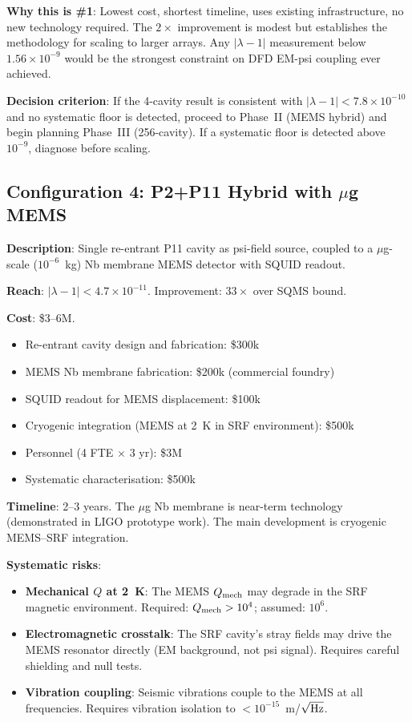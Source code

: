 \documentclass[11pt]{article}
\theoremstyle{definition}
\theoremstyle{remark}
\newcommand{\ee}[1]{\times 10^{#1}}
\newcommand{\lamdiff}{|\lambda-1|}
\begin{document}
\begin{tcolorbox}[colback=green!5!white, colframe=green!50!black,
  title=\textbf{RECOMMENDED FIRST EXPERIMENT}]
\textbf{Why this is \#1}: Lowest cost, shortest timeline, uses existing
infrastructure, no new technology required. The $2\times$ improvement is
modest but establishes the methodology for scaling to larger arrays.
Any $\lamdiff$ measurement below $1.56\ee{-9}$ would be the strongest
constraint on DFD EM-psi coupling ever achieved.

\textbf{Decision criterion}: If the 4-cavity result is consistent with
$\lamdiff < 7.8\ee{-10}$ and no systematic floor is detected, proceed
to Phase~II (MEMS hybrid) and begin planning Phase~III (256-cavity).
If a systematic floor is detected above $10^{-9}$, diagnose before scaling.
\end{tcolorbox}

\subsection{Configuration 4: P2+P11 Hybrid with $\mu$g MEMS}

\textbf{Description}: Single re-entrant P11 cavity as psi-field source,
coupled to a $\mu$g-scale ($10^{-6}$~kg) Nb membrane MEMS detector with
SQUID readout.

\textbf{Reach}: $\lamdiff < 4.7\ee{-11}$. Improvement: $33\times$ over
SQMS bound.

\textbf{Cost}: \$3--6M.
\begin{itemize}[nosep]
\item Re-entrant cavity design and fabrication: \$300k
\item MEMS Nb membrane fabrication: \$200k (commercial foundry)
\item SQUID readout for MEMS displacement: \$100k
\item Cryogenic integration (MEMS at 2~K in SRF environment): \$500k
\item Personnel (4 FTE $\times$ 3 yr): \$3M
\item Systematic characterisation: \$500k
\end{itemize}

\textbf{Timeline}: 2--3 years. The $\mu$g Nb membrane is near-term
technology (demonstrated in LIGO prototype work). The main development
is cryogenic MEMS--SRF integration.

\textbf{Systematic risks}:
\begin{itemize}[nosep]
\item \textbf{Mechanical $Q$ at 2~K}: The MEMS $Q_{\rm mech}$ may degrade
  in the SRF magnetic environment. Required: $Q_{\rm mech} > 10^4$;
  assumed: $10^6$.
\item \textbf{Electromagnetic crosstalk}: The SRF cavity's stray fields
  may drive the MEMS resonator directly (EM background, not psi signal).
  Requires careful shielding and null tests.
\item \textbf{Vibration coupling}: Seismic vibrations couple to the MEMS
  at all frequencies. Requires vibration isolation to $<10^{-15}$~m/$\sqrt{\rm Hz}$.
\end{itemize}
\end{document}
